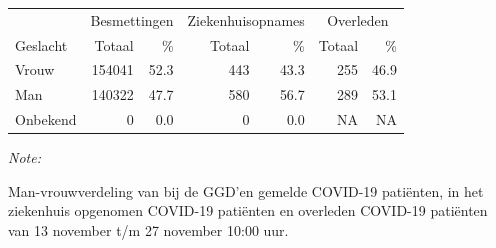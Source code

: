\documentclass[
  english,
  man,floatsintext]{apa6}
\begin{document}
\begin{table}
\centering\begingroup\fontsize{11}{13}\selectfont

\begin{threeparttable}
\begin{tabular}{lrrrrrr}
\toprule
\multicolumn{1}{c}{ } & \multicolumn{2}{c}{Besmettingen} & \multicolumn{2}{c}{Ziekenhuisopnames} & \multicolumn{2}{c}{Overleden} \\
\cmidrule(l{3pt}r{3pt}){2-3} \cmidrule(l{3pt}r{3pt}){4-5} \cmidrule(l{3pt}r{3pt}){6-7}
Geslacht & Totaal & \% & Totaal & \% & Totaal & \%\\
\midrule
Vrouw & 154041 & 52.3 & 443 & 43.3 & 255 & 46.9\\
Man & 140322 & 47.7 & 580 & 56.7 & 289 & 53.1\\
Onbekend & 0 & 0.0 & 0 & 0.0 & NA & NA\\
\bottomrule
\end{tabular}
\begin{tablenotes}
\item \textit{Note: } 
\item Man-vrouwverdeling van bij de GGD’en gemelde COVID-19 patiënten, in het ziekenhuis opgenomen COVID-19 patiënten en overleden COVID-19 patiënten van 13 november t/m 27 november 10:00 uur.
\end{tablenotes}
\end{threeparttable}
\endgroup{}
\end{table}
\newpage
\end{document}
